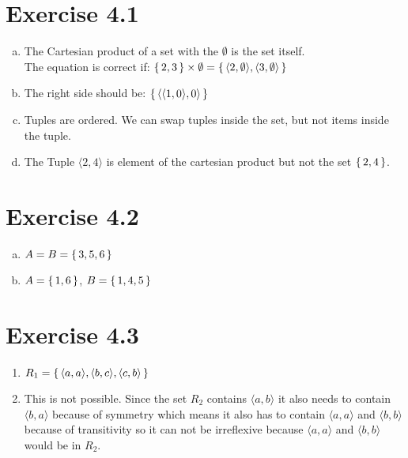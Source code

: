 \documentclass{article} %
\newcommand{\homeworkNumber}{4}
\begin{document}
\section*{Exercise \homeworkNumber.1}

\begin{enumerate}[a)]
	\item The Cartesian product of a set with the $\emptyset$ is the set itself.\\ The equation is correct if: $\set{2, 3} \times \emptyset = \set{\langle 2, \emptyset \rangle, \langle 3, \emptyset \rangle}$
	
	\item The right side should be: $\set{\langle \langle 1,0 \rangle , 0 \rangle}$
	
	\item Tuples are ordered. We can swap tuples inside the set, but not items inside the tuple.
	
	\item The Tuple $\langle 2,4 \rangle$ is element of the cartesian product but not the set $\set{2,4}$.
	
	
	
\end{enumerate}

\section*{Exercise \homeworkNumber.2}

\begin{enumerate}[a)]

\item $A = B = \set{3,5,6}$

\item $A = \set{1,6}$, $B = \set{1,4,5}$

\end{enumerate}




\section*{Exercise \homeworkNumber.3}

\begin{enumerate}
\item $R_1 = \set{\langle a,a \rangle, \langle b,c \rangle, \langle c,b \rangle}$

\item This is not possible. Since the set $R_2$ contains $\langle a,b \rangle$ it also needs to contain $\langle b,a \rangle$ because of symmetry which means it also has to contain $\langle a,a \rangle$ and $\langle b,b \rangle$ because of transitivity so it can not be irreflexive because $\langle a,a \rangle$ and $\langle b,b \rangle$ would be in $R_2$.

\end{enumerate}
\end{document}

